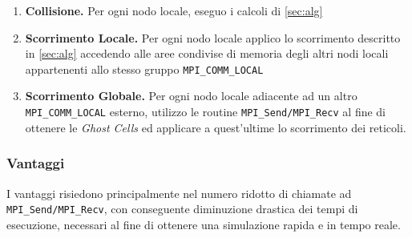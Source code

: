 \documentclass[12pt]{article}
\begin{document}
\begin{enumerate}
    \item \textbf{Collisione.} Per ogni nodo locale, eseguo i calcoli di \ref{sec:alg}
    \item \textbf{Scorrimento Locale.} Per ogni nodo locale applico lo scorrimento descritto in \ref{sec:alg} accedendo alle aree condivise di memoria degli altri nodi locali appartenenti allo stesso gruppo \verb|MPI_COMM_LOCAL|
    \item \textbf{Scorrimento Globale.} Per ogni nodo locale adiacente ad un altro \verb|MPI_COMM_LOCAL| esterno, utilizzo le routine \verb|MPI_Send/MPI_Recv| al fine di ottenere le \textit{Ghost Cells} ed applicare a quest'ultime lo scorrimento dei reticoli.
\end{enumerate}

\subsubsection{Vantaggi}
I vantaggi risiedono principalmente nel numero ridotto di chiamate ad \verb|MPI_Send/MPI_Recv|, con conseguente diminuzione drastica dei tempi di esecuzione, necessari al fine di ottenere una simulazione rapida e in tempo reale.
\end{document}
